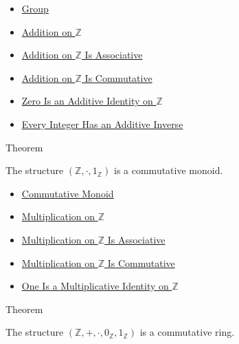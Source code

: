 \begin{dependencies}
\begin{itemize}
  \item \hyperref[def:group]{Group}
  \item \hyperref[def:addition-on-z-classes]{Addition on $\mathbb{Z}$}
  \item \hyperref[thm:addition-on-z-associative]{Addition on $\mathbb{Z}$ Is Associative}
  \item \hyperref[thm:addition-on-z-commutative]{Addition on $\mathbb{Z}$ Is Commutative}
  \item \hyperref[thm:zero-additive-identity-on-z]{Zero Is an Additive Identity on $\mathbb{Z}$}
  \item \hyperref[thm:every-integer-has-additive-inverse]{Every Integer Has an Additive Inverse}
\end{itemize}
\end{dependencies}

\begin{theorembox}{Theorem}
\begin{theorem}
\label{thm:z-multiplicative-commutative-monoid}
The structure $(\mathbb{Z},\cdot,1_{\mathbb{Z}})$ is a commutative monoid.
\end{theorem}
\end{theorembox}

\begin{dependencies}
\begin{itemize}
  \item \hyperref[def:commutative-monoid]{Commutative Monoid}
  \item \hyperref[def:multiplication-on-z-classes]{Multiplication on $\mathbb{Z}$}
  \item \hyperref[thm:multiplication-on-z-associative]{Multiplication on $\mathbb{Z}$ Is Associative}
  \item \hyperref[thm:multiplication-on-z-commutative]{Multiplication on $\mathbb{Z}$ Is Commutative}
  \item \hyperref[thm:one-multiplicative-identity-on-z]{One Is a Multiplicative Identity on $\mathbb{Z}$}
\end{itemize}
\end{dependencies}

\begin{theorembox}{Theorem}
\begin{theorem}
\label{thm:z-commutative-ring}
The structure $(\mathbb{Z},+,\cdot,0_{\mathbb{Z}},1_{\mathbb{Z}})$ is a
commutative ring.
\end{theorem}
\end{theorembox}

